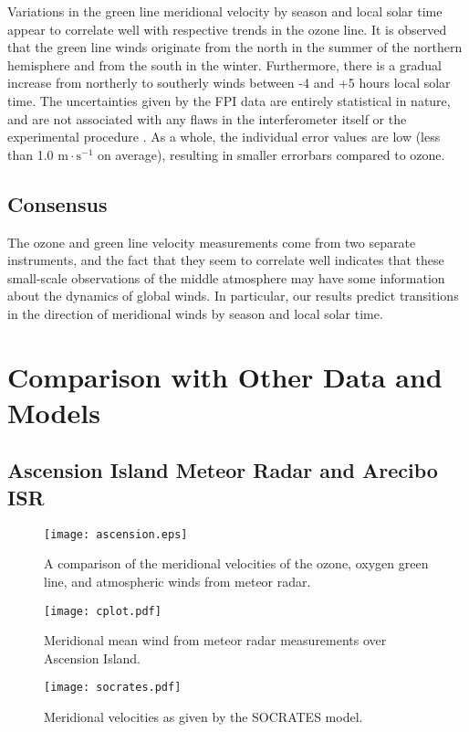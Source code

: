 \documentclass[11pt]{article}
\begin{document}
Variations in the green line meridional velocity by season and local solar time appear to correlate well with respective trends in the ozone line. It is observed that the green line winds originate from the north in the summer of the northern hemisphere and from the south in the winter. Furthermore, there is a gradual increase from northerly to southerly winds between -4 and +5 hours local solar time. The uncertainties given by the FPI data are entirely statistical in nature, and are not associated with any flaws in the interferometer itself or the experimental procedure \cite{fpi}. As a whole, the individual error values are low (less than 1.0 $\text{m}\cdot\text{s}^{-1}$ on average), resulting in smaller errorbars compared to ozone.
\subsection{Consensus}
The ozone and green line velocity measurements come from two separate instruments, and the fact that they seem to correlate well indicates that these small-scale observations of the middle atmosphere may have some information about the dynamics of global winds. In particular, our results predict transitions in the direction of meridional winds by season and local solar time.

\section{Comparison with Other Data and Models}
\subsection{Ascension Island Meteor Radar and Arecibo ISR}
	\afterpage{\clearpage}
	\begin{figure}[t]
		\centering
		\centerline{\texttt{[image: ascension.eps]}}
		\caption{A comparison of the meridional velocities of the ozone, oxygen green line, and atmospheric winds from meteor radar.}
		\label{ascension}
	\end{figure}	
	
	\begin{figure}[t]
		\centering
		\texttt{[image: cplot.pdf]}
		\caption{Meridional mean wind from meteor radar measurements over Ascension Island.}
		\label{ascension2}
	\end{figure}	
	
	\begin{figure}[t]
		\centering
		\texttt{[image: socrates.pdf]}
		\caption{Meridional velocities as given by the SOCRATES model.}
		\label{socr}
	\end{figure}
	
\end{document}
